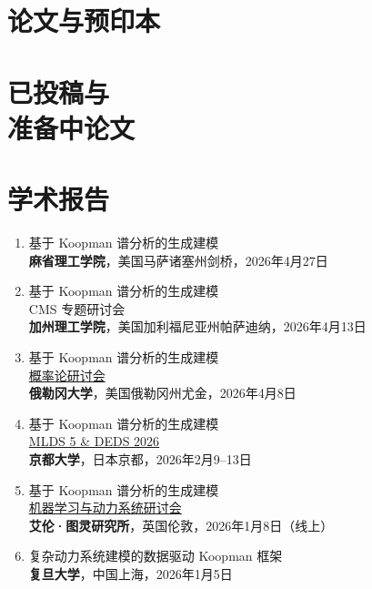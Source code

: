 \documentclass[margin]{res}
\begin{document}
\begin{resume}
\section{论文与预印本}
\nocite{*}
\printbibliography[heading=none,notkeyword=duplicate,notkeyword=draft]

\section{已投稿与\\准备中论文}
\printbibliography[heading=none,keyword=draft]

\section{学术报告}
\begin{enumerate}
    \item 基于 Koopman 谱分析的生成建模\\
    \textbf{麻省理工学院}，美国马萨诸塞州剑桥，2026年4月27日

    \item 基于 Koopman 谱分析的生成建模\\
    CMS 专题研讨会\\
    \textbf{加州理工学院}，美国加利福尼亚州帕萨迪纳，2026年4月13日

    \item 基于 Koopman 谱分析的生成建模\\
    \href{https://naturalsciences.uoregon.edu/mathematics/seminars}{概率论研讨会}\\
    \textbf{俄勒冈大学}，美国俄勒冈州尤金，2026年4月8日

    \item 基于 Koopman 谱分析的生成建模\\
    \href{https://sites.google.com/view/mlds-deds-2026}{MLDS 5 \& DEDS 2026}\\
    \textbf{京都大学}，日本京都，2026年2月9--13日

    \item 基于 Koopman 谱分析的生成建模\\
    \href{https://www.youtube.com/watch?v=FDEGkddluls&t=893s}{机器学习与动力系统研讨会}\\
    \textbf{艾伦·图灵研究所}，英国伦敦，2026年1月8日（线上）

    \item 复杂动力系统建模的数据驱动 Koopman 框架\\
    \textbf{复旦大学}，中国上海，2026年1月5日


\end{enumerate}
\end{resume}
\end{document}
